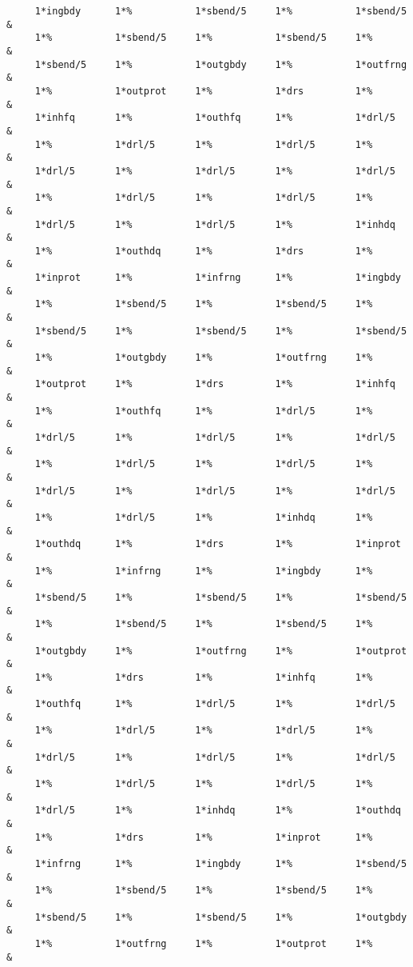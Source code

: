 \begin{footnotesize}
\begin{verbatim}
     1*ingbdy      1*%           1*sbend/5     1*%           1*sbend/5  &
     1*%           1*sbend/5     1*%           1*sbend/5     1*%        &
     1*sbend/5     1*%           1*outgbdy     1*%           1*outfrng  &
     1*%           1*outprot     1*%           1*drs         1*%        &
     1*inhfq       1*%           1*outhfq      1*%           1*drl/5    &
     1*%           1*drl/5       1*%           1*drl/5       1*%        &
     1*drl/5       1*%           1*drl/5       1*%           1*drl/5    &
     1*%           1*drl/5       1*%           1*drl/5       1*%        &
     1*drl/5       1*%           1*drl/5       1*%           1*inhdq    &
     1*%           1*outhdq      1*%           1*drs         1*%        &
     1*inprot      1*%           1*infrng      1*%           1*ingbdy   &
     1*%           1*sbend/5     1*%           1*sbend/5     1*%        &
     1*sbend/5     1*%           1*sbend/5     1*%           1*sbend/5  &
     1*%           1*outgbdy     1*%           1*outfrng     1*%        &
     1*outprot     1*%           1*drs         1*%           1*inhfq    &
     1*%           1*outhfq      1*%           1*drl/5       1*%        &
     1*drl/5       1*%           1*drl/5       1*%           1*drl/5    &
     1*%           1*drl/5       1*%           1*drl/5       1*%        &
     1*drl/5       1*%           1*drl/5       1*%           1*drl/5    &
     1*%           1*drl/5       1*%           1*inhdq       1*%        &
     1*outhdq      1*%           1*drs         1*%           1*inprot   &
     1*%           1*infrng      1*%           1*ingbdy      1*%        &
     1*sbend/5     1*%           1*sbend/5     1*%           1*sbend/5  &
     1*%           1*sbend/5     1*%           1*sbend/5     1*%        &
     1*outgbdy     1*%           1*outfrng     1*%           1*outprot  &
     1*%           1*drs         1*%           1*inhfq       1*%        &
     1*outhfq      1*%           1*drl/5       1*%           1*drl/5    &
     1*%           1*drl/5       1*%           1*drl/5       1*%        &
     1*drl/5       1*%           1*drl/5       1*%           1*drl/5    &
     1*%           1*drl/5       1*%           1*drl/5       1*%        &
     1*drl/5       1*%           1*inhdq       1*%           1*outhdq   &
     1*%           1*drs         1*%           1*inprot      1*%        &
     1*infrng      1*%           1*ingbdy      1*%           1*sbend/5  &
     1*%           1*sbend/5     1*%           1*sbend/5     1*%        &
     1*sbend/5     1*%           1*sbend/5     1*%           1*outgbdy  &
     1*%           1*outfrng     1*%           1*outprot     1*%        &

\end{verbatim}
\end{footnotesize}
